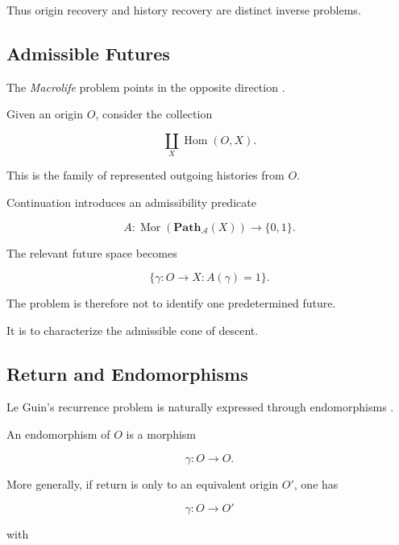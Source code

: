 \documentclass[
  11pt,
  a4paper,
  DIV=12,
  BCOR=0mm,
  parskip=half-
]{scrartcl}
\newcommand{\Hom}{\operatorname{Hom}}
\newcommand{\Mor}{\operatorname{Mor}}
\theoremstyle{definition}
\theoremstyle{plain}
\theoremstyle{remark}
\begin{document}
Thus origin recovery and history recovery are distinct inverse problems.


\subsection{Admissible Futures}
\label{app:zebrowski-categorical}

The \emph{Macrolife} problem points in the opposite direction
\cite{zebrowski1979}.

Given an origin \(O\), consider the collection

\[
  \coprod_{X}
  \Hom(O,X).
\]

This is the family of represented outgoing histories from \(O\).

Continuation introduces an admissibility predicate

\[
  A:
  \Mor(\mathbf{Path}_{\mathcal A}(X))
  \to
  \{0,1\}.
\]

The relevant future space becomes

\[
  \{
    \gamma:O\to X
    :
    A(\gamma)=1
  \}.
\]

The problem is therefore not to identify one predetermined future.

It is to characterize the admissible cone of descent.


\subsection{Return and Endomorphisms}
\label{app:leguin-categorical}

Le Guin's recurrence problem is naturally expressed through endomorphisms
\cite{leguin1974}.

An endomorphism of \(O\) is a morphism

\[
  \gamma:O\to O.
\]

More generally, if return is only to an equivalent origin \(O'\), one has

\[
  \gamma:O\to O'
\]

with
\end{document}
